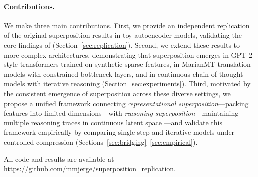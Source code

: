 \paragraph{Contributions.} We make three main contributions. First, we provide an independent replication of the original superposition results in toy autoencoder models, validating the core findings of \citet{elhage2022toy} (Section~\ref{sec:replication}). Second, we extend these results to more complex architectures, demonstrating that superposition emerges in GPT-2-style transformers trained on synthetic sparse features, in MarianMT translation models with constrained bottleneck layers, and in continuous chain-of-thought models with iterative reasoning (Section~\ref{sec:experiments}). Third, motivated by the consistent emergence of superposition across these diverse settings, we propose a unified framework connecting \emph{representational superposition}---packing features into limited dimensions---with \emph{reasoning superposition}---maintaining multiple reasoning traces in continuous latent space \citep{hao2024training, zhu2025reasoning}---and validate this framework empirically by comparing single-step and iterative models under controlled compression (Sections~\ref{sec:bridging}--\ref{sec:empirical}).


All code and results are available at \url{https://github.com/mmjerge/superposition_replication}.
